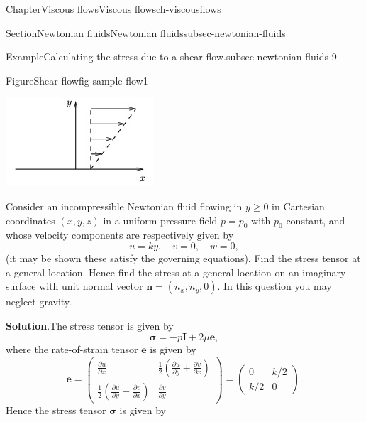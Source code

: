 \documentclass[oneside,10pt,]{book}
\newcommand{\blocktitlefont}{\relax}
\numberwithin{equation}{section}
\newcommand{\pd}[2]{\frac{\partial#1}{\partial#2}}
\newcommand{\be}{\boldsymbol{e}}
\newcommand{\bn}{\boldsymbol{n}}
\newcommand{\bsigma}{\boldsymbol{\sigma}}
\newcommand{\bI}{\boldsymbol{I}}
\begin{document}
\begin{chapterptx}{Chapter}{Viscous flows}{}{Viscous flows}{}{}{ch-viscousflows}
\begin{sectionptx}{Section}{Newtonian fluids}{}{Newtonian fluids}{}{}{subsec-newtonian-fluids}
\begin{example}{Example}{Calculating the stress due to a shear flow.}{subsec-newtonian-fluids-9}
\begin{figureptx}{Figure}{Shear flow}{fig-sample-flow1}{}
\begin{image}{0.25}{0.5}{0.25}{}
\includegraphics[width=\linewidth]{external/ch-chapter07-sample-flow1.jpg}
\end{image}%
\tcblower
\end{figureptx}%
Consider an incompressible Newtonian fluid flowing in \(y\geq0\) in Cartesian coordinates \((x,y,z)\) in a uniform pressure field \(p=p_0\) with \(p_0\) constant, and whose velocity components are respectively given by%
\begin{equation*}
u=ky,\quad v=0,\quad w=0,
\end{equation*}
(it may be shown these satisfy the governing equations). Find the stress tensor at a general location. Hence find the stress at a general location on an imaginary surface with unit normal vector \(\bn=(n_x,n_y,0)\). In this question you may neglect gravity.%
\par\smallskip%
\noindent\textbf{\blocktitlefont Solution}.\hypertarget{subsec-newtonian-fluids-9-3}{}\quad{}The stress tensor is given by%
\begin{equation*}
\bsigma=-p\bI+2\mu\be,
\end{equation*}
where the rate-of-strain tensor \(\be\) is given by%
\begin{equation*}
\be=\left(\begin{matrix}
\pd{u}{x}&\frac12\left(\pd{u}{y}+\pd{v}{x}\right)\\
\frac12\left(\pd{u}{y}+\pd{v}{x}\right)&\pd{v}{y}
\end{matrix}\right)
=\left(\begin{matrix}0&k/2\\k/2&0\end{matrix}\right).
\end{equation*}
Hence the stress tensor \(\bsigma\) is given by%
\begin{equation*}

\end{equation*}
\end{example}
\end{sectionptx}
\end{chapterptx}
\end{document}
